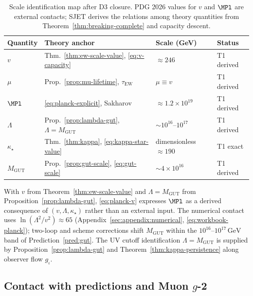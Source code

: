 \begin{table}[ht]
\centering
\small
\renewcommand{\arraystretch}{1.12}
\begin{tabular}{@{}llll@{}}
\toprule
\textbf{Quantity} & \textbf{Theory anchor} & \textbf{Scale (GeV)} &
\textbf{Status} \\
\midrule
$v$ &
  Thm.~\ref{thm:ew-scale-value}, \eqref{eq:v-capacity} &
  $\approx 246$ &
  T1 derived \\
$\mu$ &
  Prop.~\ref{prop:mu-lifetime}, $\tau_{\mathrm{EW}}$ &
  $\mu\equiv v$ &
  T1 derived \\
$\MPl$ &
  \eqref{eq:planck-explicit}, Sakharov &
  $\approx 1.2\times 10^{19}$ &
  T1 derived \\
$\Lambda$ &
  Prop.~\ref{prop:lambda-gut}, $\Lambda=M_{\mathrm{GUT}}$ &
  $\sim 10^{16}$--$10^{17}$ &
  T1 derived \\
$\kappa_\star$ &
  Thm.~\ref{thm:kappa}, \eqref{eq:kappa-star-value} &
  dimensionless $\approx 190$ &
  T1 exact \\
$M_{\mathrm{GUT}}$ &
  Prop.~\ref{prop:gut-scale}, \eqref{eq:gut-scale} &
  $\sim 4\times 10^{16}$ &
  T1 derived \\
\bottomrule
\end{tabular}
\caption{Scale identification map after D3 closure. PDG 2026 values for $v$ and
$\MPl$ are external contacts; SJET derives the relations among theory
quantities from Theorem~\ref{thm:breaking-complete} and capacity descent.}
\label{tab:scale-map}
\end{table}

\begin{remark}
With $v$ from Theorem~\ref{thm:ew-scale-value} and
$\Lambda=M_{\mathrm{GUT}}$ from Proposition~\ref{prop:lambda-gut},
\eqref{eq:planck-v} expresses $\MPl$ as a derived consequence of
$(v,\Lambda,\kappa_\star)$ rather than an external input. The numerical
contact uses $\ln(\Lambda^2/v^2)\approx 65$ (Appendix~\ref{sec:appendix:numerical},
\eqref{eq:workbook-planck}); two-loop and scheme corrections shift
$M_{\mathrm{GUT}}$ within the $10^{16}$--$10^{17}\,\mathrm{GeV}$ band of
Prediction~\ref{pred:gut}. The UV cutoff identification $\Lambda=M_{\mathrm{GUT}}$ is supplied by
Proposition~\ref{prop:lambda-gut} and Theorem~\ref{thm:kappa-persistence}
along observer flow $g_\iota$.
\end{remark}

\subsection{Contact with predictions and Muon $g$-2}
\label{sec:scales:contact}


